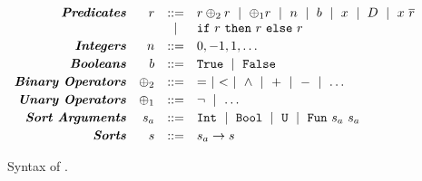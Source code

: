 \begin{figure}[t!]
\captionsetup{justification=centering}
\centering
$$
\begin{array}{rrcl}
\emphbf{Predicates} 
  & \pred & ::= &
    \pred \binop \pred \spmid
    \unop \pred
  \spmid n \spmid b \spmid x \spmid \dc \spmid  x\ \overline{\pred}\\
  && \spmid & \eif{\pred}{\pred}{\pred}
\\[0.03in]

\emphbf{Integers} 
  & n
  & ::= & 0, -1, 1, \dots
\\[0.03in]

\emphbf{Booleans} 
  & b
  & ::= & \etrue \spmid \efalse
\\[0.03in]

\emphbf{Binary Operators} 
  & \binop
  & ::= & = \spmid < \spmid \land \spmid + \spmid - \spmid \dots
\\[0.03in]

\emphbf{Unary Operators} 
  & \unop
  & ::= & \lnot \spmid \dots 
\\[0.03in]

\emphbf{Sort Arguments} 
  & \sort_a
  & ::= & \tint \spmid \tbool \spmid \tuniv 
         \spmid \tsmtfun{\sort_a}{\sort_a}
\\[0.03in]
\emphbf{Sorts} 
  & \sort
  & ::=  & \sort_a \rightarrow \sort
\end{array}
$$
\caption{{Syntax of \smtlan}.}
\label{fig:smtsyntax}
\vspace{-2mm}
\end{figure}
